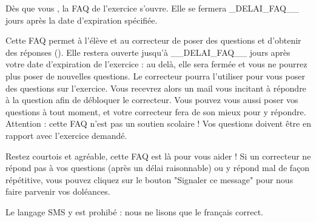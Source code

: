 ﻿Dès que vous , la FAQ de l'exercice s'ouvre. Elle se fermera _DELAI_FAQ__ jours après la date d'expiration spécifiée.

Cette FAQ permet à l'élève et au correcteur de poser des questions et d'obtenir des réponses ().
Elle restera ouverte jusqu'à __DELAI_FAQ__ jours après votre date d'expiration de l'exercice : au delà, elle sera fermée et vous ne pourrez plus poser de nouvelles questions.
Le correcteur pourra l'utiliser pour vous poser des questions sur l'exercice. Vous recevrez alors un mail vous incitant à répondre à la question afin de débloquer le correcteur.
Vous pouvez vous aussi poser vos questions à tout moment, et votre correcteur fera de son mieux pour y répondre.
Attention : cette FAQ n'est pas un soutien scolaire ! Vos questions doivent être en rapport avec l'exercice demandé.

Restez courtois et agréable, cette FAQ est là pour vous aider !
Si un correcteur ne répond pas à vos questions (après un délai raisonnable) ou y répond mal de façon répétitive, vous pouvez cliquez sur le bouton "Signaler ce message" pour nous faire parvenir vos doléances.

Le langage SMS y est prohibé : nous ne lisons que le français correct.